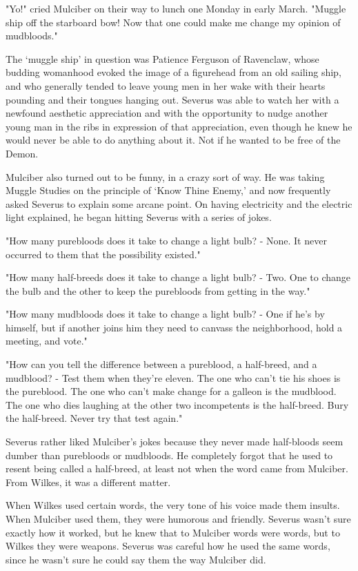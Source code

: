 \documentclass[a4paper,11pt]{article}
\begin{document}
"Yo!" cried Mulciber on their way to lunch one Monday in early March. "Muggle ship off the starboard bow! Now that one could make me change my opinion of mudbloods."

The `muggle ship' in question was Patience Ferguson of Ravenclaw, whose budding womanhood evoked the image of a figurehead from an old sailing ship, and who generally tended to leave young men in her wake with their hearts pounding and their tongues hanging out. Severus was able to watch her with a newfound aesthetic appreciation and with the opportunity to nudge another young man in the ribs in expression of that appreciation, even though he knew he would never be able to do anything about it. Not if he wanted to be free of the Demon.

Mulciber also turned out to be funny, in a crazy sort of way. He was taking Muggle Studies on the principle of `Know Thine Enemy,' and now frequently asked Severus to explain some arcane point. On having electricity and the electric light explained, he began hitting Severus with a series of jokes.

"How many purebloods does it take to change a light bulb? - None. It never occurred to them that the possibility existed."

"How many half-breeds does it take to change a light bulb? - Two. One to change the bulb and the other to keep the purebloods from getting in the way."

"How many mudbloods does it take to change a light bulb? - One if he's by himself, but if another joins him they need to canvass the neighborhood, hold a meeting, and vote."

"How can you tell the difference between a pureblood, a half-breed, and a mudblood? - Test them when they're eleven. The one who can't tie his shoes is the pureblood. The one who can't make change for a galleon is the mudblood. The one who dies laughing at the other two incompetents is the half-breed. Bury the half-breed. Never try that test again."

Severus rather liked Mulciber's jokes because they never made half-bloods seem dumber than purebloods or mudbloods. He completely forgot that he used to resent being called a half-breed, at least not when the word came from Mulciber. From Wilkes, it was a different matter.

When Wilkes used certain words, the very tone of his voice made them insults. When Mulciber used them, they were humorous and friendly. Severus wasn't sure exactly how it worked, but he knew that to Mulciber words were words, but to Wilkes they were weapons. Severus was careful how he used the same words, since he wasn't sure he could say them the way Mulciber did.
\end{document}
